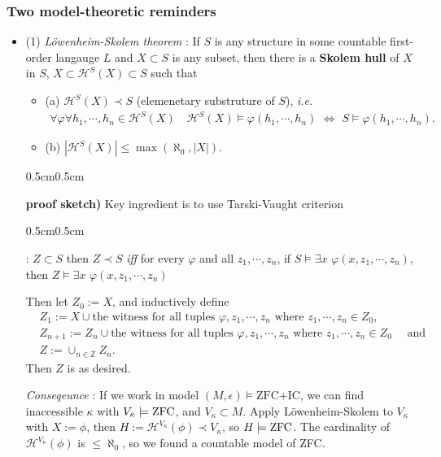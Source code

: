 \documentclass[12pt,a4paper]{article}
\newenvironment{subproof}
{\begin{changemargin}{0.5cm}{0.5cm} 
	}%
	{\end{changemargin}
}
\renewenvironment{i}
{\begin{itemize} 
	}%
	{\end{itemize}
}
\begin{document}
\subsubsection*{Two model-theoretic reminders}
\begin{i}
\item[(1)] \emph{L\"owenheim-Skolem theorem} : If $S$ is any structure in some countable first-order langauge $L$ and $X\subset S$ is any subset, then there is a \textbf{Skolem hull} of $X$ in $S$, $X\subset \mathcal{H}^S(X) \subset S$ such that
\begin{i}
\item[(a)] $\mathcal{H}^S(X) \prec S$ (elemenetary substruture of $S$), \textit{i.e.} 
\begin{align*}
\forall \varphi \forall h_1,\cdots,h_n \in \mathcal{H}^S(X)\quad \mathcal{H}^S(X) \models \varphi(h_1, \cdots, h_n) \,\, \Leftrightarrow \,\, S\models \varphi(h_1, \cdots, h_n).
\end{align*}
\item[(b)] $|\mathcal{H}^S(X)| \leq \max (\aleph_0, |X|)$.
\end{i}
\begin{subproof}
\textbf{proof sketch)} Key ingredient is to use Tarski-Vaught criterion
\begin{subproof}
: $Z\subset S$ then $Z\prec S$ \emph{iff} for every $\varphi$ and all $z_1, \cdots, z_n$, if $S\models \exists x\,\, \varphi(x, z_1, \cdots,z_n)$, then $Z\models \exists x\,\, \varphi(x, z_1, \cdots, z_n)$
\end{subproof}

Then let $Z_0 := X$, and inductively define
\begin{align*}
&Z_1 := X\cup\text{the witness for all tuples }\varphi, z_1, \cdots, z_n\text{ where }z_1, \cdots, z_n \in Z_0,\\
&Z_{n+1} :=Z_n \cup\text{the witness for all tuples }\varphi, z_1, \cdots, z_n\text{ where }z_1, \cdots, z_n \in Z_0 \quad \text{ and}\\
&Z := \cup_{n\in \mathbb{Z}}Z_n.
\end{align*}
Then $Z$ is as desired.
\end{subproof}
\emph{Conseqeunce} : If we work in model $(M, \epsilon) \models \text{ZFC+IC}$, we can find inaccessible $\kappa$ with $V_{\kappa} \models \text{ZFC}$, and $V_{\kappa} \subset M$. Apply L\"owenheim-Skolem to $V_{\kappa}$ with $X:= \phi$, then $H:= \mathcal{H}^{V_{\kappa}} (\phi) \prec V_{\kappa}$, so $H\models \text{ZFC}$. The cardinality of $\mathcal{H}^{V_{\kappa}} (\phi)$ is $\leq \aleph_0$, so we found a countable model of ZFC.


\end{i}
\end{document}
